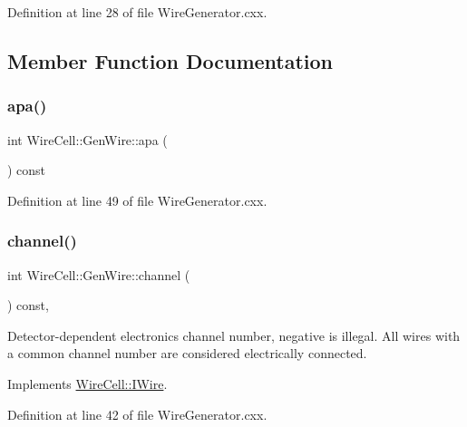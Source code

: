 Definition at line 28 of file Wire\+Generator.\+cxx.



\subsection{Member Function Documentation}
\mbox{\label{class_wire_cell_1_1_gen_wire_a00d554142db2c73522bb723a9c484aaa}} 
\subsubsection{\texorpdfstring{apa()}{apa()}}
{\footnotesize\ttfamily int Wire\+Cell\+::\+Gen\+Wire\+::apa (\begin{DoxyParamCaption}{ }\end{DoxyParamCaption}) const\hspace{0.3cm}{\ttfamily [inline]}}



Definition at line 49 of file Wire\+Generator.\+cxx.

\mbox{\label{class_wire_cell_1_1_gen_wire_a98e2ccfbe7f784cdcddbb49e8097be6f}} 
\subsubsection{\texorpdfstring{channel()}{channel()}}
{\footnotesize\ttfamily int Wire\+Cell\+::\+Gen\+Wire\+::channel (\begin{DoxyParamCaption}{ }\end{DoxyParamCaption}) const\hspace{0.3cm}{\ttfamily [inline]}, {\ttfamily [virtual]}}

Detector-\/dependent electronics channel number, negative is illegal. All wires with a common channel number are considered electrically connected. 

Implements \hyperlink{class_wire_cell_1_1_i_wire_a24de34af80ad78b15137adb196ed1189}{Wire\+Cell\+::\+I\+Wire}.



Definition at line 42 of file Wire\+Generator.\+cxx.

